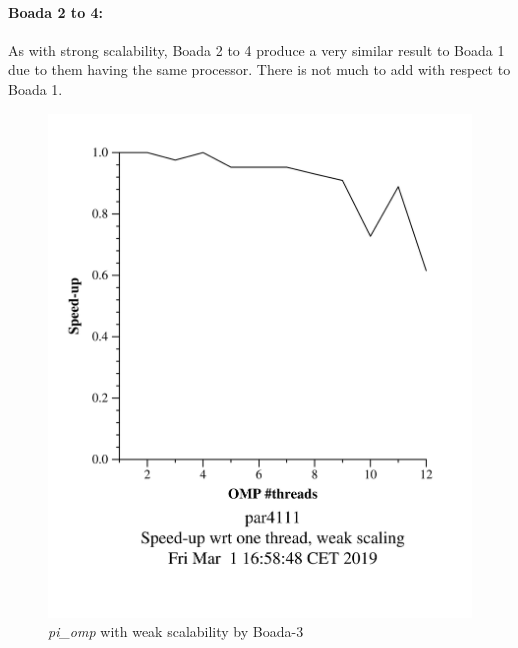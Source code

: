 \documentclass[12]{article}
\begin{document}
\bigskip
\paragraph{Boada 2 to 4:}
As with strong scalability, Boada 2 to 4 produce a very similar result to Boada 1 due to them having the same processor. There is not much to add with respect to Boada 1.
\begin{figure}[H]
\centering
\includegraphics[scale=0.15]{images/pi_omp-100000000-1-12-3-weak-boada-3.png}
 \caption{ \textit{pi\_omp} with weak scalability by Boada-3}
  \label{fig:pi_weak_ompboada3}
\end{figure}

\bigskip
\end{document}
